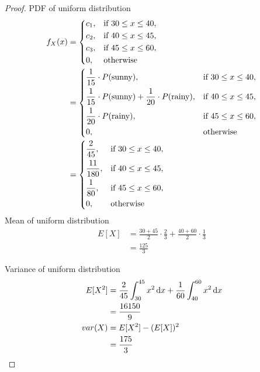 \documentclass[paper=usletter, fontsize=12pt]{article}
\begin{document}
\begin{enumerate}
\begin{enumerate}
\begin{proof}
                PDF of uniform distribution
                \begin{align*}
                    f_X(x) & =
                    \begin{dcases}
                        c_1,  & \text{if } 30 \le x \le 40,\\
                        c_2,  & \text{if } 40 \le x \le 45,\\
                        c_3,  & \text{if } 45 \le x \le 60,\\
                        0,    & \text{otherwise}
                    \end{dcases}\\
                    & = \begin{dcases}
                        \frac{1}{15} \cdot P(\text{sunny}), & \text{if } 30 \le x \le 40,\\
                        \frac{1}{15} \cdot P(\text{sunny}) + \frac{1}{20} \cdot P(\text{rainy}), & \text{if } 40 \le x \le 45,\\
                        \frac{1}{20} \cdot P(\text{rainy}), & \text{if } 45 \le x \le 60,\\
                        0,    & \text{otherwise}
                    \end{dcases}\\
                    & =\begin{dcases}
                        \frac{2}{45}, & \text{if } 30 \le x \le 40,\\
                        \frac{11}{180}, & \text{if } 40 \le x \le 45,\\
                        \frac{1}{80}, & \text{if } 45 \le x \le 60,\\
                        0,    & \text{otherwise}
                    \end{dcases}
                \end{align*}
                \endgroup
                Mean of uniform distribution
                \begin{align*}
                    E[X] & = \frac{30+45}{2} \cdot \frac{2}{3} + \frac{40+60}{2} \cdot \frac{1}{3}\\
                    & = \frac{125}{3}
                \end{align*}
                \endgroup

                Variance of uniform distribution
                \begin{align*}
                    E[X^2] & = \frac{2}{45}\int_{30}^{45}x^2\mathop{}\!\mathrm{d}{x} + \frac{1}{60}\int_{40}^{60}x^2\mathop{}\!\mathrm{d}{x}\\
                    & = \frac{16150}{9}\\
                    var(X) & = E[X^2] - (E[X])^2\\
                    & = \frac{175}{3}  \qedhere
                \end{align*}
                \endgroup


\end{proof}
\end{enumerate}
\end{enumerate}
\end{document}

